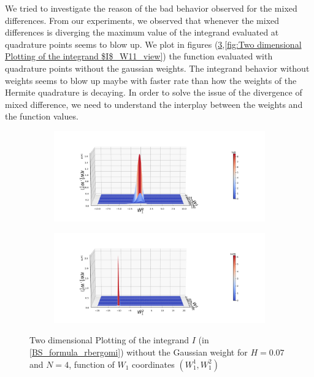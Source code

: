 \documentclass[11pt]{article}
\begin{document}
	

We tried to investigate the reason of the bad behavior observed for the mixed differences. From our experiments, we observed that whenever the mixed differences is diverging the maximum value of the integrand evaluated at quadrature points seems to blow up. We plot in figures (\ref{fig:Two dimensional Plotting of the integrand $I$_W12_view},\ref{fig:Two dimensional Plotting of the integrand $I$_W11_view})  the function evaluated with quadrature points without the gaussian weights. The integrand behavior without weights seems to blow up maybe with faster rate than how the weights of the Hermite quadrature is decaying. In order to solve the issue of the divergence of mixed difference, we need to understand the interplay between  the weights and the function values.


\begin{figure}[h!]
	\centering
	\begin{subfigure}{.4\textwidth}
		\centering
		\includegraphics[width=1\linewidth]{./figures/integrand_plotting_rBergomi/2D_plots/N_4/H_007/integrand_without_density/Bergomi_integrand_contours_K_1_H_007_W1_1_2_N_4_without_weights_0}
		\caption{}
		\label{fig:sub3}
	\end{subfigure}%
	\begin{subfigure}{.4\textwidth}
		\centering
		\includegraphics[width=1\linewidth]{./figures/integrand_plotting_rBergomi/2D_plots/N_4/H_007/integrand_without_density/Bergomi_integrand_contours_K_1_H_007_W1_1_2_N_4_without_weights_2_0}
		\caption{}
		\label{fig:sub4}
	\end{subfigure}
	
	
	
	\caption{Two dimensional Plotting of the integrand $I$ (in \eqref{BS_formula_rbergomi}) without the Gaussian weight  for $H=0.07$ and $N=4$, function of $W_1$ coordinates $(W_1^1,W^2_1)$}
	\label{fig:Two dimensional Plotting of the integrand $I$_W12_view}
\end{figure}
\end{document}
